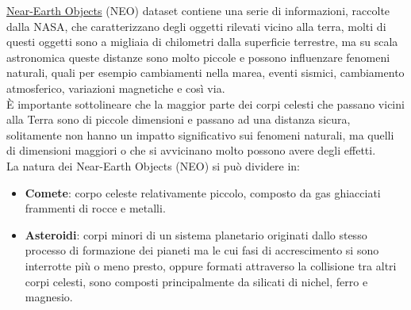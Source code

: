 \documentclass[italian,12pt,a4paper]{article}
\begin{document}
	\href{https://www.kaggle.com/datasets/sameepvani/nasa-nearest-earth-objects/}{Near-Earth Objects} (NEO) dataset contiene una serie di informazioni, raccolte dalla NASA, che caratterizzano degli oggetti rilevati vicino alla terra, molti di questi oggetti sono a migliaia di chilometri dalla superficie terrestre, ma su scala astronomica queste distanze sono molto piccole e possono influenzare fenomeni naturali, quali per esempio cambiamenti nella marea, eventi sismici, cambiamento atmosferico, variazioni magnetiche e così via. \\
	È importante sottolineare che la maggior parte dei corpi celesti che passano vicini alla Terra sono di piccole dimensioni e passano ad una distanza sicura, solitamente non hanno un impatto significativo sui fenomeni naturali, ma quelli di dimensioni maggiori o che si avvicinano molto possono avere degli effetti. \\
	\linebreak
	La natura dei Near-Earth Objects (NEO) si può dividere in:
	\begin{itemize}
		\item \textbf{Comete}: corpo celeste relativamente piccolo, composto da gas ghiacciati frammenti di rocce e metalli.
		\item \textbf{Asteroidi}: corpi minori di un sistema planetario originati dallo stesso processo di formazione dei pianeti ma le cui fasi di accrescimento si sono interrotte più o meno presto, oppure formati attraverso la collisione tra altri corpi celesti, sono composti principalmente da silicati di nichel, ferro e magnesio.
	\end{itemize}

	
\end{document}
